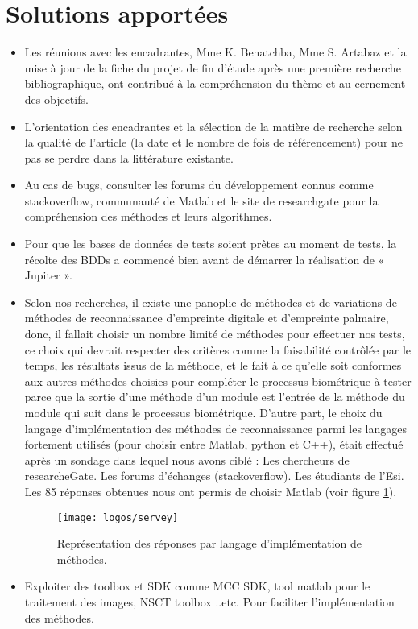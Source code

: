 \section*{Solutions apportées}
\begin{itemize}
	\item Les réunions avec les encadrantes, Mme K. Benatchba, Mme S. Artabaz et la mise à jour de la fiche du projet de fin d'étude après une première recherche bibliographique, ont contribué à la compréhension du thème et au cernement des objectifs.
	\item L'orientation des encadrantes et la sélection de la matière de recherche selon la qualité de l'article (la date et le nombre de fois de référencement) pour ne pas se perdre dans la littérature existante.
	\item Au cas de bugs, consulter les forums du développement connus comme stackoverflow, communauté de Matlab et le site de researchgate pour la compréhension des méthodes et leurs algorithmes.
	\item Pour que les bases de données de tests soient prêtes au moment de tests, la récolte des BDDs a commencé bien avant de démarrer la réalisation de « Jupiter ».
	\item Selon nos recherches, il existe une panoplie de méthodes et de variations de méthodes de reconnaissance d'empreinte digitale et d'empreinte palmaire, donc, il fallait choisir un nombre limité de méthodes pour effectuer nos tests, ce choix qui devrait respecter des critères comme la faisabilité contrôlée par le temps, les résultats issus de la méthode, et le fait à ce qu'elle soit conformes aux autres méthodes choisies pour compléter le processus biométrique à tester parce que la sortie d'une méthode d'un module est l'entrée de la méthode du module qui suit dans le processus biométrique.
	D'autre part, le choix du langage d'implémentation des méthodes de reconnaissance parmi les langages fortement utilisés (pour choisir entre Matlab, python et C++), était effectué après un sondage dans lequel nous avons ciblé :
	\subitem Les chercheurs de researcheGate.
	\subitem Les forums d'échanges (stackoverflow).
	\subitem Les étudiants de l'Esi.
\\	Les 85 réponses obtenues nous ont permis de choisir Matlab (voir figure \ref{fig:servey}).
	\begin{center}
		\begin{figure}[H]
			\centering
			\texttt{[image: logos/servey]}
			\caption{Représentation des réponses par langage d'implémentation de méthodes.}
			\label{fig:servey}
		\end{figure}
	\end{center}
	\item Exploiter des toolbox et SDK comme MCC SDK, tool matlab pour le traitement des images, NSCT toolbox ..etc. Pour faciliter l'implémentation des méthodes.

\end{itemize}
